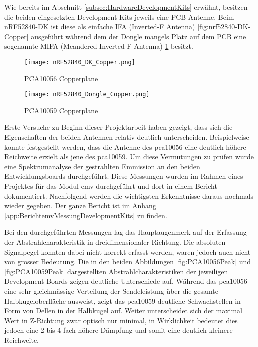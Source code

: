 Wie bereits im Abschnitt \ref{subsec:HardwareDevelopmentKits} erwähnt, besitzen die beiden eingesetzten Development Kits jeweils eine PCB Antenne. Beim nRF52840-DK ist diese als einfache IFA (Inverted-F Antenna) \ref{fig:nrf52840-DK-Copper} ausgeführt während dem der Dongle mangels Platz auf dem PCB eine sogenannte MIFA (Meandered Inverted-F Antenna) \ref{fig:nrf52840-Dongle-Copper} besitzt.

\begin{figure}[!htbp]
\centering
\begin{minipage}[b]{0.49\textwidth}
		\centering
		\texttt{[image: nRF52840\_DK\_Copper.png]}
		\caption[PCA10056 Copperplane mit IFA-Antenne]{PCA10056 Copperplane \cite{nordic_semiconductor_asa_pca10056_schematic_and_pcb_2019}}
		\label{fig:nrf52840-DK-Copper}
\end{minipage}
\begin{minipage}[b]{0.49\textwidth}
		\centering
		\texttt{[image: nRF52840\_Dongle\_Copper.png]}
		\caption[PCA10059 Copperplane mit MIFA-Antenne]{PCA10059 Copperplane \cite{nordic_semiconductor_asa_pca10059_schematic_and_pcb_2020}}
		\label{fig:nrf52840-Dongle-Copper}
\end{minipage}
\end{figure}

Erste Versuche zu Beginn dieser Projektarbeit haben gezeigt, dass sich die Eigenschaften der beiden Antennen relativ deutlich unterscheiden. Beispielweise konnte festgestellt werden, dass die Antenne des pca10056 eine deutlich höhere Reichweite erzielt als jene des pca10059.
Um diese Vermutungen zu prüfen wurde eine Spektrumanalyse der gestrahlten Emmission an den beiden Entwicklungsboards durchgeführt. Diese Messungen wurden im Rahmen eines Projektes für das Modul emv durchgeführt und dort in einem Bericht dokumentiert. Nachfolgend werden die wichtigsten Erkenntnisse daraus nochmals wieder gegeben. Der ganze Bericht ist im Anhang \ref{app:BerichtemvMessungDevelopmentKits} zu finden.

Bei den durchgeführten Messungen lag das Hauptaugenmerk auf der Erfassung der Abstrahlcharakteristik in dreidimensionaler Richtung. Die absoluten Signalpegel konnten dabei nicht korrekt erfasst werden, waren jedoch auch nicht von grosser Bedeutung.
Die in den beiden Abbildungen \ref{fig:PCA10056Peak} und \ref{fig:PCA10059Peak} dargestellten Abstrahlcharakteristiken der jeweiligen Development Boards zeigen deutliche Unterschiede auf. Während das pca10056 eine sehr gleichmässige Verteilung der Sendeleistung über die gesamte Halbkugeloberfläche ausweist, zeigt das pca10059 deutliche Schwachstellen in Form von Dellen in der Halbkugel auf.
Weiter unterscheidet sich der maximal Wert in Z-Richtung zwar optisch nur minimal, in Wirklichkeit bedeutet dies jedoch eine 2 bis 4 fach höhere Dämpfung und somit eine deutlich kleinere Reichweite.

